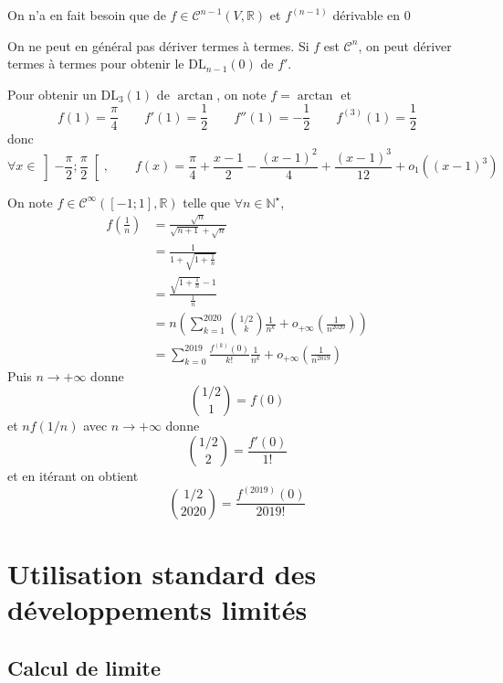 \begin{rem}
    On n'a en fait besoin que de $f\in\mathcal C^{n-1}(V, \mathbb R)$ et $f^{(n-1)}$ dérivable en $0$
\end{rem}

\begin{rem}
    On ne peut en général pas dériver termes à termes. Si $f$ est $\mathcal C^n$, on peut dériver termes à termes pour obtenir le $\mathrm{DL}_{n-1}(0)$ de $f'$.
\end{rem}

\begin{ex}[$a$]
    Pour obtenir un $\mathrm{DL}_3(1)$ de $\arctan$, on note $f=\arctan$ et \[
        f(1)=\frac\pi4\qquad f'(1)=\frac12\qquad f''(1)=-\frac12\qquad f^{(3)}(1)=\frac1{2}
    \]
    donc \[
        \forall x\in \left]-\frac\pi2;\frac\pi2  \right[, \qquad f(x)=\frac\pi4+\frac{x-1}2-\frac{(x-1)^2}4+\frac{(x-1)^3}{12}+o_1((x-1)^3)
    \]
\end{ex}

\begin{ex}[$b$]
    On note $f\in\mathcal C^{\infty}([-1; 1], \mathbb R)$ telle que $\forall n\in\mathbb N^\star$, \begin{align*}
        f \left( \frac1n \right) &= \frac{\sqrt n}{\sqrt{n+1}+\sqrt n}\\
                                 &= \frac1{1+\sqrt{1+\frac1n}}\\
                                 &= \frac{\sqrt{1+\frac1n}-1}{\frac 1n}\\
                                 &= n \left( \sum_{k=1}^{2020}\binom {1/2}{k}\frac1{n^k}+o_{+\infty}(\frac{1}{n^{2020}}) \right) \\
                                 &= \sum_{k=0}^{2019}\frac{f^{(k)}(0)}{k!}\frac1{n^k}+o_{+\infty}(\frac1{n^{2019}})
    \end{align*}
    Puis $n\to +\infty$ donne \[
        \binom{1/2}1=f(0)
    \]
    et $nf(1/n)$ avec $n\to+\infty$ donne \[
        \binom{1/2}2=\frac{f'(0)}{1!}
    \]
    et en itérant on obtient \[
        \binom{1/2}{2020}=\frac{f^{(2019)}(0)}{2019!}
    \]
\end{ex}

\section{Utilisation standard des développements limités}

\subsection{Calcul de limite}

